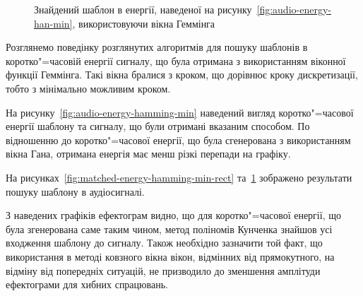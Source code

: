 \begin{figure}[h]

            \caption{Знайдений шаблон в енергії, наведеної на рисунку~\ref{fig:audio-energy-han-min}, використовуючи
                вікна Геммінга}
            \label{fig:matched-energy-han-min-hamming}
        \end{figure}

        \clearpage

        Розглянемо поведінку розглянутих алгоритмів для пошуку шаблонів в коротко"=часовій енергії сигналу, що була
        отримана з використанням віконної функції Геммінга.
        Такі вікна бралися з кроком, що дорівнює кроку дискретизації, тобто з мінімально можливим кроком.

        На рисунку~\ref{fig:audio-energy-hamming-min} наведений вигляд коротко"=часової енергії шаблону та сигналу, що
        були отримані вказаним способом.
        По відношенню до коротко"=часової енергії, що була сгенерована з використанням вікна Гана, отримана енергія
        має менш різкі перепади на графіку.

        На рисунках~\ref{fig:matched-energy-hamming-min-rect} та~\ref{fig:matched-energy-han-min-hamming} зображено
        результати пошуку шаблону в аудіосигналі.

        З наведених графіків ефектограм видно, що для коротко"=часової енергії, що була згенерована саме таким чином,
        метод поліномів Кунченка знайшов усі входження шаблону до сигналу.
        Також необхідно зазначити той факт, що використання в методі ковзного вікна вікон, відмінних від прямокутного,
        на відміну від попередніх ситуацій, не призводило до зменшення амплітуди ефектограми для хибних спрацювань.


